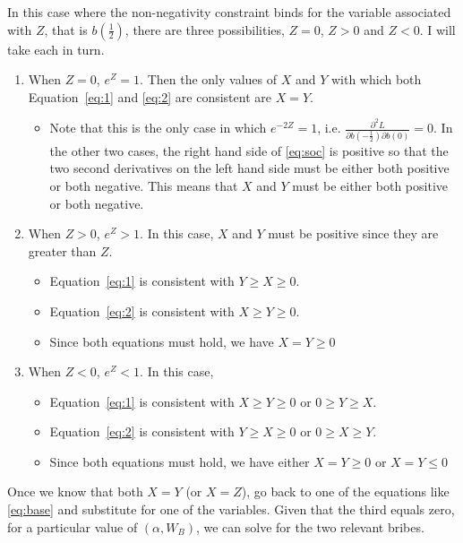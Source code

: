 \documentclass[12pt]{article}
\begin{document}
In this case where the non-negativity constraint binds for the variable associated with $Z$, that is $b\left(\frac{1}{2}\right)$, there are three possibilities, $Z=0$, $Z>0$ and $Z<0$. I will take each in turn.
\begin{enumerate}
	\item When $Z = 0$, $e^Z = 1$. Then the only values of $X$ and $Y$ with which both Equation~\ref{eq:1} and \ref{eq:2} are consistent are $X=Y$.
		\begin{itemize}
			\item Note that this is the only case in which $e^{-2Z} =1$, i.e. $\frac{\partial^2 L}{\partial b\left(-\frac{1}{2}\right)\partial b\left(0\right)} = 0$. In the other two cases, the right hand side of \ref{eq:soc} is positive so that the two second derivatives on the left hand side must be either both positive or both negative. This means that $X$ and $Y$ must be either both positive or both negative.
		\end{itemize}

	\item When $Z > 0$, $e^Z > 1$. In this case, $X$ and $Y$ must be positive since they are greater than $Z$.
		\begin{itemize}
			\item Equation~\ref{eq:1} is consistent with $Y\geq X\geq 0$.
			\item Equation~\ref{eq:2} is consistent with $X \geq Y \geq 0$.
			\item Since both equations must hold, we have $X=Y \geq 0$
		\end{itemize}
			
	\item When $Z < 0$, $e^Z < 1$. In this case,
			\begin{itemize}
				\item Equation~\ref{eq:1} is consistent with $X\geq Y\geq 0$ or $0 \geq Y \geq X$.
				\item Equation~\ref{eq:2} is consistent with $Y \geq X \geq 0$ or $0 \geq X \geq Y$.
				\item Since both equations must hold, we have either $X=Y \geq 0$ or $X=Y \leq 0$
		\end{itemize}
	

	
\end{enumerate}

Once we know that both $X=Y$ (or $X=Z$), go back to one of the equations like \ref{eq:base} and substitute for one of the variables. Given that the third equals zero, for a particular value of $\left(\alpha,W_B\right)$, we can solve for the two relevant bribes.
\end{document}
